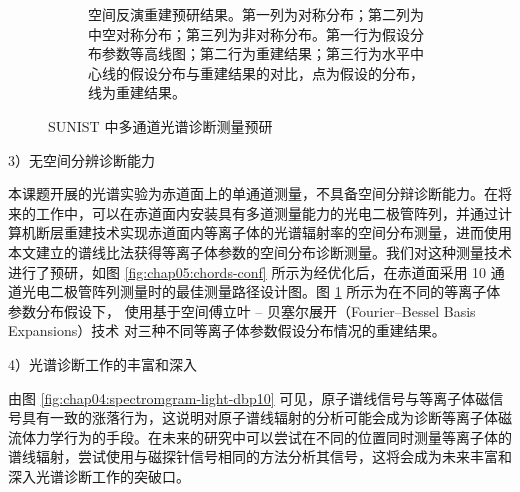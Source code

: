 \begin{figure}
\begin{center}
\begin{subfigure}{0.6\textwidth}
    \caption{空间反演重建预研结果。第一列为对称分布；第二列为中空对称分布；第三列为非对称分布。第一行为假设分布参数等高线图；第二行为重建结果；第三行为水平中心线的假设分布与重建结果的对比，点为假设的分布，线为重建结果。}
    \label{fig:chap05:test-plot}
  \end{subfigure}
\end{center}
  \caption{SUNIST 中多通道光谱诊断测量预研}
  \label{fig:chap05:pda-measuring}
\end{figure}


3）无空间分辨诊断能力

本课题开展的光谱实验为赤道面上的单通道测量，不具备空间分辩诊断能力。在将来的工作中，可以在赤道面内安装具有多道测量能力的光电二极管阵列，并通过计算机断层重建技术实现赤道面内等离子体的光谱辐射率的空间分布测量，进而使用本文建立的谱线比法获得等离子体参数的空间分布诊断测量。我们对这种测量技术进行了预研，如图 \ref{fig:chap05:chords-conf} 所示为经优化后，在赤道面采用 10 通道光电二极管阵列测量时的最佳测量路径设计图。图 \ref{fig:chap05:test-plot} 所示为在不同的等离子体参数分布假设下，
使用基于空间傅立叶 -- 贝塞尔展开（Fourier–Bessel Basis Expansions）技术
\cite{Cormack1963:1,Cormack1964:2,WangLing1991:RadonTransform,RuanHuailin:Tomography}对三种不同等离子体参数假设分布情况的重建结果。


4）光谱诊断工作的丰富和深入

由图 \ref{fig:chap04:spectromgram-light-dbp10} 可见，原子谱线信号与等离子体磁信号具有一致的涨落行为，这说明对原子谱线辐射的分析可能会成为诊断等离子体磁流体力学行为的手段。在未来的研究中可以尝试在不同的位置同时测量等离子体的谱线辐射，尝试使用与磁探针信号相同的方法\cite{ZengLong2010:Thesis}分析其信号，这将会成为未来丰富和深入光谱诊断工作的突破口。

%
%
